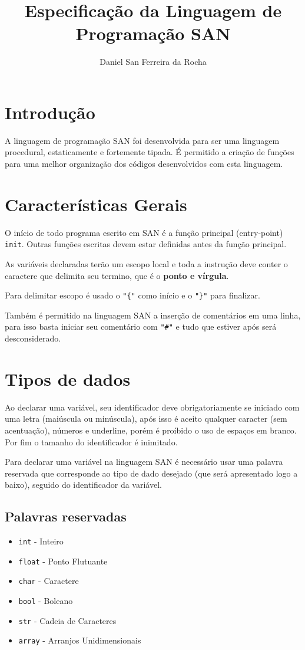 \documentclass[a4paper,11pt]{article}
\title{Especificação da Linguagem de Programação SAN}
\author{Daniel San Ferreira da Rocha}
\begin{document}
\clearpage\maketitle
\thispagestyle{empty}

\pagebreak

\tableofcontents

\pagebreak

\section{Introdução}
A linguagem de programação SAN foi desenvolvida para ser uma linguagem procedural, estaticamente
e fortemente tipada. É permitido a criação de funções para uma melhor organização dos códigos
desenvolvidos com esta linguagem.

\section{Características Gerais}
O início de todo programa escrito em SAN é a função principal (entry-point) \texttt{init}.
Outras funções escritas devem estar definidas antes da função principal.

As variáveis declaradas terão um escopo local e toda a instrução deve conter o caractere que
delimita seu termino, que é o \textbf{ponto e vírgula}.

Para delimitar escopo é usado o \texttt{"\{"} como início e o \texttt{"\}"} para finalizar.

Também é permitido na linguagem SAN a inserção de comentários em uma linha, para isso basta
iniciar seu comentário com \texttt{"\#"} e tudo que estiver após será desconsiderado.

\section{Tipos de dados}
Ao declarar uma variável, seu identificador deve obrigatoriamente se iniciado com uma letra
(maiúscula ou minúscula), após isso é aceito qualquer caracter (sem acentuação), números e
underline, porém é proíbido o uso de espaços em branco. Por fim o tamanho do identificador
é inimitado.

Para declarar uma variável na linguagem SAN é necessário usar uma palavra reservada que
corresponde ao tipo de dado desejado (que será apresentado logo a baixo), seguido do
identificador da variável.

\subsection{Palavras reservadas}
\begin{itemize}
    \item \texttt{int} - Inteiro
    \item \texttt{float} - Ponto Flutuante
    \item \texttt{char} - Caractere
    \item \texttt{bool} - Boleano
    \item \texttt{str} - Cadeia de Caracteres
    \item \texttt{array} - Arranjos Unidimensionais
\end{itemize}
\end{document}
